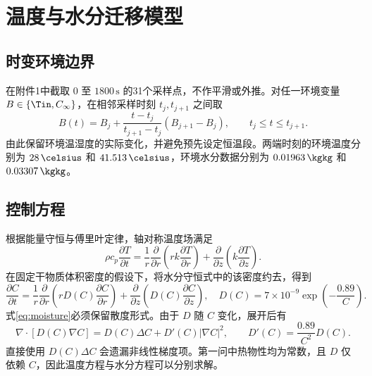 \section{温度与水分迁移模型}

\subsection{时变环境边界}
在附件1中截取 $0$ 至 $1800\,\mathrm{s}$ 的31个采样点，不作平滑或外推。对任一环境变量 $B\in\{\Tin,C_\infty\}$，在相邻采样时刻 $t_j,t_{j+1}$ 之间取
\begin{equation}
 B(t)=B_j+\frac{t-t_j}{t_{j+1}-t_j}(B_{j+1}-B_j),\qquad t_j\le t\le t_{j+1}.
 \label{eq:ambient}
\end{equation}
由此保留环境温湿度的实际变化，并避免预先设定恒温段。两端时刻的环境温度分别为 $28\,\celsius$ 和 $41.513\,\celsius$，环境水分数据分别为 $0.01963\,\kgkg$ 和 $0.03307\,\kgkg$。

\subsection{控制方程}
根据能量守恒与傅里叶定律，轴对称温度场满足
\begin{equation}
 \rho c_p\frac{\partial T}{\partial t}
 =\frac{1}{r}\frac{\partial}{\partial r}\left(rk\frac{\partial T}{\partial r}\right)
  +\frac{\partial}{\partial z}\left(k\frac{\partial T}{\partial z}\right).
 \label{eq:heat}
\end{equation}
在固定干物质体积密度的假设下，将水分守恒式中的该密度约去，得到
\begin{equation}
 \frac{\partial C}{\partial t}
 =\frac{1}{r}\frac{\partial}{\partial r}\left(rD(C)\frac{\partial C}{\partial r}\right)
  +\frac{\partial}{\partial z}\left(D(C)\frac{\partial C}{\partial z}\right),\quad
 D(C)=7\times10^{-9}\exp\left(-\frac{0.89}{C}\right).
 \label{eq:moisture}
\end{equation}
式\eqref{eq:moisture}必须保留散度形式。由于 $D$ 随 $C$ 变化，展开后有
\begin{equation}
 \nabla\!\cdot[D(C)\nabla C]
 =D(C)\Delta C+D'(C)|\nabla C|^2,\qquad
 D'(C)=\frac{0.89}{C^2}D(C).
 \label{eq:nonlinear}
\end{equation}
直接使用 $D(C)\Delta C$ 会遗漏非线性梯度项。第一问中热物性均为常数，且 $D$ 仅依赖 $C$，因此温度方程与水分方程可以分别求解。

